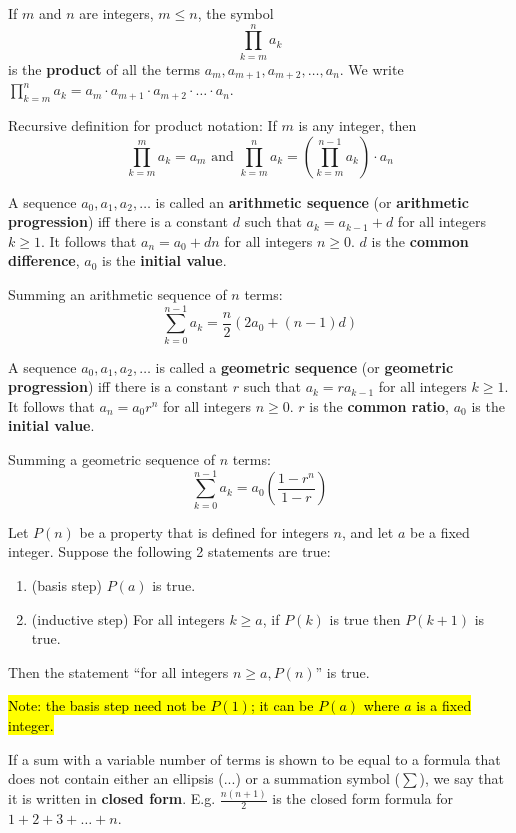 \documentclass{article}
\begin{document}
\begin{description}
    \item[Product Notation]If $m$ and $n$ are integers, $m\leq n$, the symbol \[\prod_{k=m}^{n}a_{k}\] is the \textbf{product} of all the terms $a_{m}, a_{m+1},a_{m+2},\dots,a_{n}$. We write $\prod_{k=m}^{n}a_{k}=a_{m} \cdot a_{m+1} \cdot a_{m+2} \cdot \dots \cdot a_{n}$.
    \item \qquad Recursive definition for product notation: If $m$ is any integer, then \[\prod_{k=m}^{m}a_{k}=a_{m} \text{ and } \prod_{k=m}^{n}a_{k}=(\prod_{k=m}^{n-1}a_{k})\cdot a_{n} \]
    \item[Arithmetic Sequence] A sequence $a_{0}, a_{1},a_{2},\dots$ is called an \textbf{arithmetic sequence} (or \textbf{arithmetic progression}) iff there is a constant $d$ such that $a_{k}=a_{k-1}+d$ for all integers $k\geq 1$. It follows that $a_{n}= a_{0}+dn$ for all integers $n\geq 0$. $d$ is the \textbf{common difference}, $a_{0}$ is the \textbf{initial value}.
    \item \qquad Summing an arithmetic sequence of $n$ terms: \[\sum_{k=0}^{n-1}a_{k}=\frac{n}{2}(2a_{0}+(n-1)d)\]
    \item[Geometric Sequence] A sequence $a_{0}, a_{1},a_{2},\dots$ is called a \textbf{geometric sequence} (or \textbf{geometric progression}) iff there is a constant $r$ such that $a_{k}=ra_{k-1}$ for all integers $k\geq 1$. It follows that $a_{n}=a_{0}r^{n}$ for all integers $n\geq 0$. $r$ is the \textbf{common ratio}, $a_{0}$ is the \textbf{initial value}.
    \item \qquad Summing a geometric sequence of $n$ terms: \[ \sum_{k=0}^{n-1}a_{k}=a_{0}(\frac{1-r^{n}}{1-r}) \] 
    \item[Principal of Mathematical Induction (PMI)] Let $P(n)$ be a property that is defined for integers $n$, and let $a$ be a fixed integer. Suppose the following 2 statements are true:
    \begin{enumerate}
    	\item (basis step) $P(a)$ is true. 
		\item (inductive step) For all integers $k\geq a$, if $P(k)$ is true then $P(k+1)$ is true.     \end{enumerate}
    \item \qquad Then the statement ``for all integers $n\geq a, P(n)$'' is true.
    \item \qquad \hl{Note: the basis step need not be $P(1)$; it can be $P(a)$ where $a$ is a fixed integer.}     
    \item[Closed Form] If a sum with a variable number of terms is shown to be equal to a formula that does not contain either an ellipsis (...) or a summation symbol ($\sum$), we say that it is written in \textbf{closed form}. E.g. $\frac{n(n+1)}{2}$ is the closed form formula for $1+2+3+\dots+n$.

\end{description}
\end{document}
